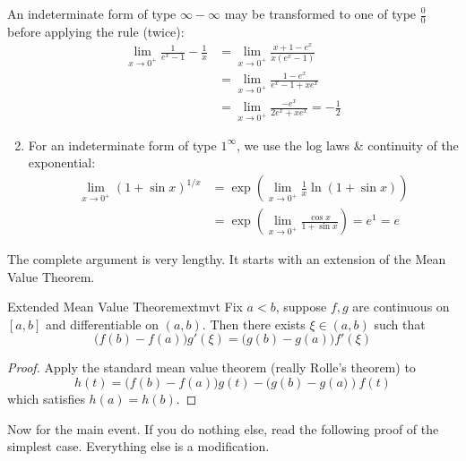 \begin{examples}{}{}
	\exstart An indeterminate form of type $\infty-\infty$ may be transformed to one of type $\frac 00$ before applying the rule (twice):
	  \begin{align*}
	  	\lim\limits_{x\to 0^+}\frac 1{e^x-1}-\frac 1x
	  	&=\lim\limits_{x\to 0^+}\frac{x+1-e^x}{x(e^x-1)} \tag{type $\frac 00$}\\
	  	&=\lim\limits_{x\to 0^+}\frac{1-e^x}{e^x-1+xe^x} \tag{still type $\frac 00$}\\
	  	&=\lim\limits_{x\to 0^+}\frac{-e^x}{2e^x+xe^x} =-\frac 12
	  \end{align*}
	  
	\goodbreak
	  
	\begin{enumerate}\setcounter{enumi}{1}
	 	\item For an indeterminate form of type $1^\infty$, we use the log laws \& continuity of the exponential:
	 	\begin{align*}
		 	\lim_{x\to 0^+} (1+\sin x)^{1/x}
		 	&=\exp\left(\lim_{x\to 0^+} \frac 1x\ln(1+\sin x)\right) \tag{type $\frac 00$}\\
		 	&=\exp\left(\lim_{x\to 0^+} \frac{\cos x}{1+\sin x}\right) 
		 	=e^1=e
	 	\end{align*}
 	\end{enumerate}
\end{examples}



The complete argument is very lengthy. It starts with an extension of the Mean Value Theorem.

\begin{lemm}{Extended Mean Value Theorem}{extmvt}
	Fix $a<b$, suppose $f,g$ are continuous on $[a,b]$ and differentiable on $(a,b)$. Then there exists $\xi\in(a,b)$ such that
	\[
		\big(f(b)-f(a)\big)g'(\xi)=\big(g(b)-g(a)\big)f'(\xi)
	\] 
\end{lemm}

\begin{proof}
	Apply the standard mean value theorem (really Rolle's theorem) to
	\[
		h(t)=\bigl(f(b)-f(a)\bigr)g(t)-\bigl(g(b)-g(a\bigr))f(t)
	\]
	which satisfies $h(a)=h(b)$.
\end{proof}


Now for the main event. If you do nothing else, read the following proof of the simplest case. Everything else is a modification.

